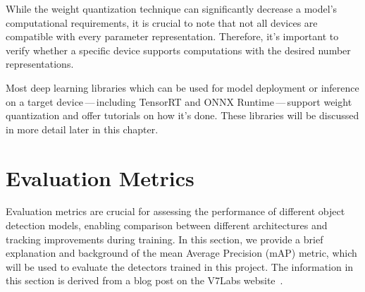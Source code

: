 While the weight quantization technique can significantly decrease a model's
computational requirements, it is crucial to note that not all devices are
compatible with every parameter representation. Therefore, it's important to
verify whether a specific device supports computations with the desired number
representations.




Most deep learning libraries which can be used for model deployment or inference
on a target device\,---\,including TensorRT and ONNX Runtime\,---\,support
weight quantization and offer tutorials on how it's done. These libraries will
be discussed in more detail later in this chapter.



\section{Evaluation Metrics}
\label{EvaluationMetrics}

Evaluation metrics are crucial for assessing the performance of different object
detection models, enabling comparison between different architectures and
tracking improvements during training. In this section, we provide a brief
explanation and background of the mean Average Precision (mAP) metric, which
will be used to evaluate the detectors trained in this project. The information
in this section is derived from a blog post on the V7Labs website~\cite{mAP}.


